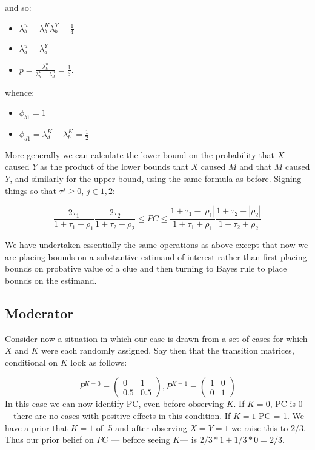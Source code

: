 \documentclass[12pt,]{book}
\providecommand{\tightlist}{%
  \setlength{\itemsep}{0pt}\setlength{\parskip}{0pt}}
\begin{document}
and so:

\begin{itemize}
\tightlist
\item
  \(\lambda_b^u = \lambda_b^K\lambda_b^Y = \frac{1}4\)
\item
  \(\lambda_d^u = \lambda_d^Y\)
\item
  \(p = \frac{\lambda_b^u}{\lambda_b^u + \lambda_d^u} = \frac{1}3\).
\end{itemize}

whence:

\begin{itemize}
\tightlist
\item
  \(\phi_{b1} = 1\)
\item
  \(\phi_{d1} = \lambda_d^K + \lambda_b^K = \frac{1}{2}\)
\end{itemize}

More generally we can calculate the lower bound on the probability that \(X\) caused \(Y\) as the product of the lower bounds that \(X\) caused \(M\) and that \(M\) caused \(Y\), and similarly for the upper bound, using the same formula as before. Signing things so that \(\tau^j\geq 0\), \(j \in {1,2}\):

\[\frac{2\tau_1}{1+\tau_1+\rho_1}\frac{2\tau_2}{1+\tau_2+\rho_2}  \leq PC \leq \frac{1+\tau_1-|\rho_1|}{1+\tau_1+\rho_1}\frac{1+\tau_2-|\rho_2|}{1+\tau_2+\rho_2} \]

We have undertaken essentially the same operations as above except that now we are placing bounds on a substantive estimand of interest rather than first placing bounds on probative value of a clue and then turning to Bayes rule to place bounds on the estimand.

\hypertarget{moderator}{%
\subsection{Moderator}\label{moderator}}

Consider now a situation in which our case is drawn from a set of cases for which \(X\) and \(K\) were each randomly assigned. Say then that the transition matrices, conditional on \(K\) look as follows:

\[P^{K=0}=\left( \begin{array}{cc} 0 & 1 \\ 0.5 & 0.5 \end{array}\right), P^{K=1}=\left( \begin{array}{cc} 1 & 0 \\ 0 & 1 \end{array}\right)\]
In this case we can now identify PC, even before observing \(K\). If \(K=0\), PC is 0---there are no cases with positive effects in this condition. If \(K=1\) PC = 1. We have a prior that \(K=1\) of .5 and after observing \(X=Y=1\) we raise this to \(2/3\). Thus our prior belief on \(PC\) --- before seeing \(K\)--- is \(2/3 * 1 + 1/3 * 0 = 2/3\).
\end{document}
